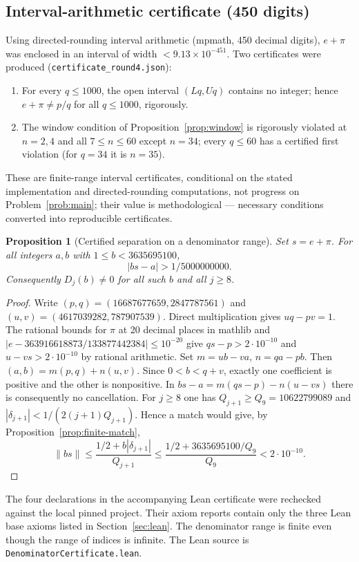 \documentclass[11pt]{amsart}
\newtheorem{proposition}[theorem]{Proposition}
\theoremstyle{definition}
\theoremstyle{remark}
\numberwithin{equation}{section}
\begin{document}
\subsection{Interval-arithmetic certificate (450 digits)}

Using directed-rounding interval arithmetic (mpmath, 450 decimal digits), $e+\pi$ was enclosed in an interval of width $<9.13\times10^{-451}$. Two certificates were produced (\texttt{certificate\_\allowbreak{}round4.json}):
\begin{enumerate}
\item For every $q\le1000$, the open interval $(Lq,Uq)$ contains no integer; hence $e+\pi\ne p/q$ for all $q\le1000$, rigorously.
\item The window condition of Proposition~\ref{prop:window} is rigorously violated at $n=2,4$ and all $7\le n\le60$ except $n=34$; every $q\le60$ has a certified first violation (for $q=34$ it is $n=35$).
\end{enumerate}
These are finite-range interval certificates, conditional on the stated implementation and directed-rounding computations, not progress on Problem~\ref{prob:main}; their value is methodological --- necessary conditions converted into reproducible certificates.

\begin{proposition}[Certified separation on a denominator range]\label{prop:farey-gap}
Set $s=e+\pi$. For all integers $a,b$ with $1\le b<3635695100$,
\[
  |bs-a|>1/5000000000 .
\]
Consequently $D_j(b)\ne0$ for all such $b$ and all $j\ge8$.
\end{proposition}
\begin{proof}
Write $(p,q)=(16687677659,2847787561)$ and
$(u,v)=(4617039282,787907539)$. Direct multiplication gives $uq-pv=1$.
The rational bounds for $\pi$ at 20 decimal places in mathlib and
$|e-363916618873/133877442384|\le10^{-20}$ give
$q s-p>2\cdot10^{-10}$ and $u-vs>2\cdot10^{-10}$ by rational arithmetic.
Set $m=ub-va$, $n=qa-pb$. Then $(a,b)=m(p,q)+n(u,v)$.
Since $0<b<q+v$, exactly one coefficient is positive and the other is
nonpositive. In $bs-a=m(qs-p)-n(u-vs)$ there is consequently no
cancellation. For $j\ge8$ one has $Q_{j+1}\ge Q_9=10622799089$ and
$|\delta_{j+1}|<1/(2(j+1)Q_{j+1})$. Hence a match would give, by
Proposition~\ref{prop:finite-match},
\[
 \|bs\|\le\frac{1/2+b|\delta_{j+1}|}{Q_{j+1}}
 \le\frac{1/2+3635695100/Q_9}{Q_9}<2\cdot10^{-10}.
\]
\end{proof}
The four declarations in the accompanying Lean certificate were rechecked against the local pinned project. Their axiom reports contain only the three Lean base axioms listed in Section~\ref{sec:lean}. The denominator range is finite even though the range of indices is
infinite. The Lean source is \texttt{DenominatorCertificate.lean}.
\end{document}
